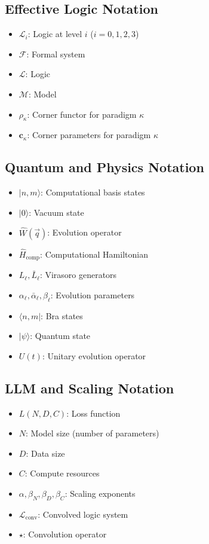\subsection{Effective Logic Notation}
\begin{itemize}
\item $\mathcal{L}_i$: Logic at level $i$ ($i = 0,1,2,3$)
\item $\mathcal{F}$: Formal system
\item $\mathcal{L}$: Logic
\item $\mathcal{M}$: Model
\item $\rho_\kappa$: Corner functor for paradigm $\kappa$
\item $\mathbf{c}_\kappa$: Corner parameters for paradigm $\kappa$
\end{itemize}

\subsection{Quantum and Physics Notation}
\begin{itemize}
\item $|n,m\rangle$: Computational basis states
\item $|0\rangle$: Vacuum state
\item $\hat{W}(\vec{q})$: Evolution operator
\item $\hat{H}_{\text{comp}}$: Computational Hamiltonian
\item $L_\ell, \bar{L}_\ell$: Virasoro generators
\item $\alpha_\ell, \bar{\alpha}_\ell, \beta_\ell$: Evolution parameters
\item $\langle n,m|$: Bra states
\item $|\psi\rangle$: Quantum state
\item $U(t)$: Unitary evolution operator
\end{itemize}

\subsection{LLM and Scaling Notation}
\begin{itemize}
\item $L(N, D, C)$: Loss function
\item $N$: Model size (number of parameters)
\item $D$: Data size
\item $C$: Compute resources
\item $\alpha, \beta_N, \beta_D, \beta_C$: Scaling exponents
\item $\mathcal{L}_{\text{conv}}$: Convolved logic system
\item $\star$: Convolution operator
\end{itemize}

